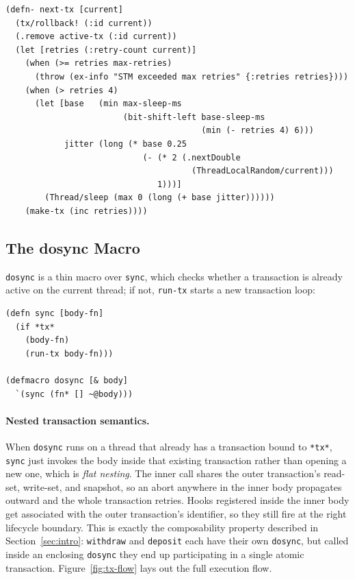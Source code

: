 \begin{listing}[H]
  \begin{verbatim}
(defn- next-tx [current]
  (tx/rollback! (:id current))
  (.remove active-tx (:id current))
  (let [retries (:retry-count current)]
    (when (>= retries max-retries)
      (throw (ex-info "STM exceeded max retries" {:retries retries})))
    (when (> retries 4)
      (let [base   (min max-sleep-ms
                        (bit-shift-left base-sleep-ms
                                        (min (- retries 4) 6)))
            jitter (long (* base 0.25
                            (- (* 2 (.nextDouble
                                      (ThreadLocalRandom/current)))
                               1)))]
        (Thread/sleep (max 0 (long (+ base jitter))))))
    (make-tx (inc retries))))
\end{verbatim}
  \caption{Retry with bounded exponential backoff. The four-retry period
    avoids sleep overhead for short-lived conflicts.}
  \label{lst:next-tx}
\end{listing}

\subsection{The dosync Macro}

\texttt{dosync} is a thin macro over \texttt{sync}, which checks whether a
transaction is already active on the current thread; if not, \texttt{run-tx}
starts a new transaction loop:

\begin{listing}[H]
  \begin{verbatim}
(defn sync [body-fn]
  (if *tx*
    (body-fn)
    (run-tx body-fn)))

(defmacro dosync [& body]
  `(sync (fn* [] ~@body)))
\end{verbatim}
  \caption{\texttt{dosync} delegates to \texttt{sync}, which joins an existing
    transaction if one is active, or starts a new one via \texttt{run-tx}.}
  \label{lst:dosync}
\end{listing}

\paragraph{Nested transaction semantics.}
When \texttt{dosync} runs on a thread that already has a transaction bound
to \texttt{*tx*}, \texttt{sync} just invokes the body inside that existing
transaction rather than opening a new one, which is \emph{flat nesting}. The inner
call shares the outer transaction's read-set, write-set, and snapshot, so an
abort anywhere in the inner body propagates outward and the whole
transaction retries. Hooks registered inside the inner body get associated
with the outer transaction's identifier, so they still fire at the right
lifecycle boundary. This is exactly the composability property described in
Section~\ref{sec:intro}: \texttt{withdraw} and \texttt{deposit} each have
their own \texttt{dosync}, but called inside an enclosing \texttt{dosync}
they end up participating in a single atomic transaction.
Figure~\ref{fig:tx-flow} lays out the full execution flow.

